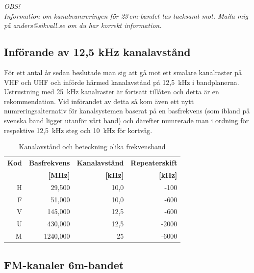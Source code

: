\textit{OBS!\\ Information om kanalnumreringen för 23\,cm-bandet tas tacksamt
mot. Maila mig på anders@sikvall.se om du har korrekt information.}

\subsection{Införande av 12,5 kHz kanalavstånd}

För ett antal år sedan beslutade man sig att gå mot ett smalare kanalraster på
VHF och UHF och införde härmed kanalavstånd på 12,5~kHz i bandplanerna.
Ustrustning med 25~kHz kanalraster är fortsatt tillåten och detta är en
rekommendation. Vid införandet av detta så kom även ett nytt
numreringsalternativ för kanalsystemen baserat på en basfrekvens (som ibland
på svenska band ligger utanför vårt band) och därefter numrerade man i ordning
för respektive 12,5~kHz steg och 10~kHz för kortvåg.

\begin{table}[h]
\centering
\begin{tabular}{rrrr}
	\bf Kod & \bf Basfrekvens & \bf Kanalavstånd & \bf Repeaterskift \\
	        &      \bf  [MHz] &        \bf [kHz] &         \bf [kHz] \\ \hline
	      H &          29,500 &             10,0 &              -100 \\
	      F &          51,000 &             10,0 &              -600 \\
	      V &         145,000 &             12,5 &              -600 \\
	      U &         430,000 &             12,5 &             -2000 \\
	      M &        1240,000 &               25 &             -6000
\end{tabular}
\label{tab:kanalavstand}
\caption{Kanalavstånd och beteckning olika frekvensband}
\end{table}

\subsection{FM-kanaler 6m-bandet}

